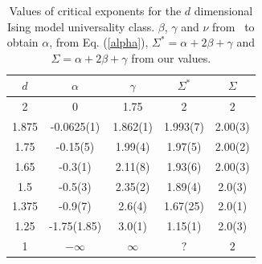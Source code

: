 \documentclass[pre,aps,twocolumn,showpacs,floatfix,nofootinbib,superscriptaddress,linenumbers]{revtex4-1}
\begin{document}



\begin{table}[]
\begin{tabular}{c|cccc}
\hline\hline
$d$     & $\alpha$       & $\gamma$    & $\Sigma^*$  & $\Sigma$ \\ \hline
2     & 0          & 1.75     & 2    &  2  \\
1.875 & -0.0625(1) & 1.862(1) & 1.993(7) & 2.00(3)\\
1.75  & -0.15(5)  & 1.99(4)  & 1.97(5) & 2.00(2) \\
1.65  & -0.3(1)      & 2.11(8)  & 1.93(6) & 2.00(3) \\
1.5   & -0.5(3)  & 2.35(2)  & 1.89(4) & 2.0(3) \\
1.375 & -0.9(7)    & 2.6(4)   & 1.67(25) & 2.0(1)    \\
1.25  & -1.75(1.85)   & 3.0(1)   & 1.15(1) & 2.0(3) \\
1     & $-\infty$   & $\infty$ & $?$ & 2\\ \hline\hline

\end{tabular}

\caption{Values of critical exponents for  the $d$ dimensional Ising model universality class.  $\beta$, $\gamma$ and $\nu$ from~\cite{f.y.wu} to obtain $\alpha$, from Eq. (\ref{alpha}), 
$\Sigma^*= \alpha +2\beta+\gamma$ and  $\Sigma= \alpha +2\beta+\gamma$ from our values.}
\label{Table2}
\end{table}
\end{document}
